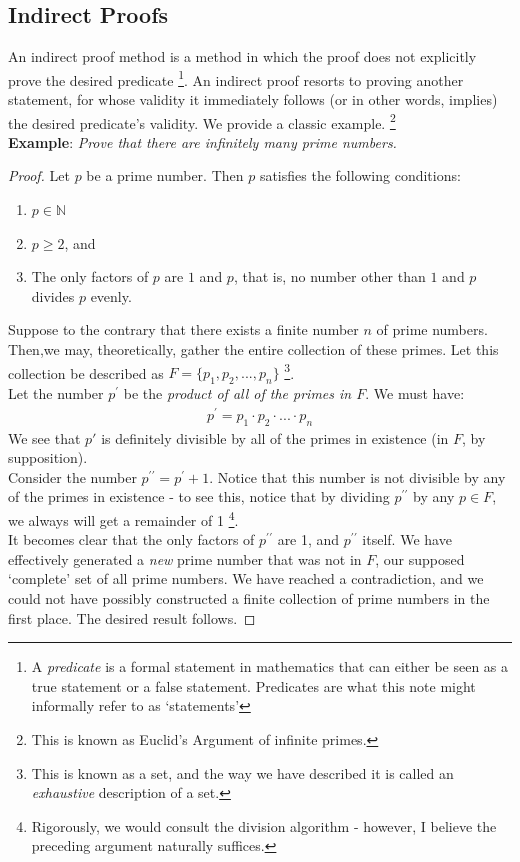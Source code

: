 \documentclass[10pt,a4paper,fleqn]{article}
\newcommand{\example}[1]{\textbf{Example}: \emph{#1}}
\let \oldprime \prime
\renewcommand{\prime}{^{\oldprime}}
\newcommand{\dprime}{^{\oldprime\oldprime}}
\begin{document}
	\subsection{Indirect Proofs}
	An indirect proof method is a method in which the proof does not explicitly prove the desired predicate \footnote{A \emph{predicate} is a formal statement in mathematics that can either be seen as a true statement or a false statement. Predicates are what this note might informally refer to as `statements'}. An indirect proof resorts to proving another statement, for whose validity it immediately follows (or in other words, implies) the desired predicate's validity. We provide a classic example. \footnote{This is known as Euclid's Argument of infinite primes.} \\
		
		\noindent \example{Prove that there are infinitely many prime numbers.}
		\begin{proof} 
			Let $p$ be a prime number. Then $p$ satisfies the following conditions:
				\begin{enumerate}
					\item $p \in \mathbb{N}$
					\item $p \geq 2$, and
					\item The only factors of $p$ are $1$ and $p$, that is, no number other than $1$ and $p$ divides $p$ evenly.
				\end{enumerate}
			Suppose to the contrary that there exists a finite number $n$ of prime numbers. \\
			Then,we may, theoretically, gather the entire collection of these primes. Let this collection be described as $F = \{p_1, p_2, ..., p_n\}$ \footnote{This is known as a set, and the way we have described it is called an \emph{exhaustive} description of a set.}. \\
			Let the number $p\prime$ be the \emph{product of all of the primes in $F$}. We must have:
			\begin{align*}
				p\prime = p_1 \cdot p_2 \cdot ... \cdot p_n
			\end{align*}
			We see that $p'$ is definitely divisible by all of the primes in existence (in $F$, by supposition). \\
			Consider the number $p \dprime = p \prime + 1$. Notice that this number is not divisible by any of the primes in existence - to see this, notice that by dividing $p \dprime $ by any $p \in F$, we always will get a remainder of 1 \footnote{Rigorously, we would consult the division algorithm - however, I believe the preceding argument naturally suffices.}. \\
			
			It becomes clear that the only factors of $p \dprime$ are 1, and $p \dprime$ itself. We have effectively generated a \emph{new} prime number that was not in $F$, our supposed `complete' set of all prime numbers. We have reached a contradiction, and we could not have possibly constructed a finite collection of prime numbers in the first place. The desired result follows.	\end{proof}
	
\end{document}
